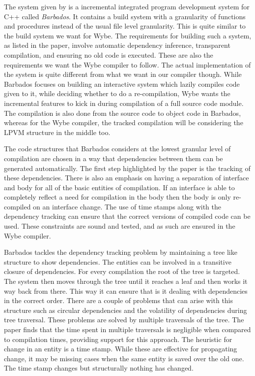 The system given by \cite{cpp_compiler} is a incremental integrated program
development system for C++ called \textit{Barbados}. It contains a build system
with a granularity of functions and procedures instead of the usual file level
granularity. This is quite similar to the build system we want for Wybe. The
requirements for building such a system, as listed in the paper, involve
automatic dependency inference, transparent compilation, and ensuring no old
code is executed. These are also the requirements we want the Wybe compiler to
follow. The actual implementation of the system is quite different from what we
want in our compiler though. While Barbados focuses on building an interactive
system which lazily compiles code given to it, while deciding whether to do a
re-compilation, Wybe wants the incremental features to kick in during
compilation of a full source code module. The compilation is also done from the
source code to object code in Barbados, whereas for the Wybe compiler, the
tracked compilation will be considering the LPVM structure in the middle too.

The code structures that Barbados considers at the lowest granular level of
compilation are chosen in a way that dependencies between them can be generated
automatically. The first step highlighted by the paper is the tracking of these
dependencies. There is also an emphasis on having a separation of interface and
body for all of the basic entities of compilation. If an interface is able to
completely reflect a need for compilation in the body then the body is only
re-compiled on an interface change. The use of time stamps along with the
dependency tracking can ensure that the correct versions of compiled code can
be used. These constraints are sound and tested, and as such are ensured in the
Wybe compiler.

Barbados tackles the dependency tracking problem by maintaining a tree like
structure to show dependencies. The entities can be involved in a transitive
closure of dependencies. For every compilation the root of the tree is
targeted. The system then moves through the tree until it reaches a leaf and
then works it way back from there. This way it can ensure that is it dealing
with dependencies in the correct order. There are a couple of problems that can
arise with this structure such as circular dependencies and the volatility of
dependencies during tree traversal. These problems are solved by multiple
traversals of the tree. The paper finds that the time spent in multiple
traversals is negligible when compared to compilation times, providing support
for this approach. The heuristic for change in an entity is a time stamp. While
these are effective for propagating change, it may be missing cases when the
same entity is saved over the old one. The time stamp changes but structurally
nothing has changed.


